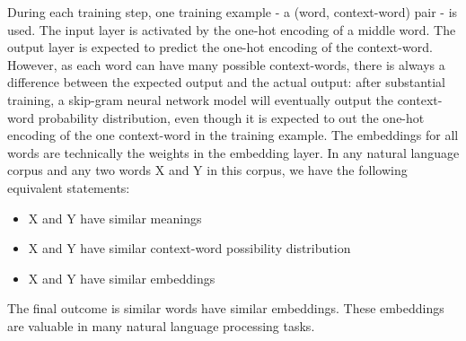 \documentclass[conference]{IEEEtran}
\begin{document}
During each training step, one training example - a (word, context-word) pair - is used.
The input layer is activated by the one-hot encoding of a middle word.
The output layer is expected to predict the one-hot encoding of the context-word.
However, as each word can have many possible context-words, there is always a difference between the expected output and the actual output:
after substantial training, a skip-gram neural network model will eventually output the context-word probability distribution,
even though it is expected to out the one-hot encoding of the one context-word in the training example.
The embeddings for all words are technically the weights in the embedding layer.
In any natural language corpus and any two words X and Y in this corpus, we have the following equivalent statements:
\begin{itemize}
	\item X and Y have similar meanings
	\item X and Y have similar context-word possibility distribution 
	\item X and Y have similar embeddings
\end{itemize}
The final outcome is similar words have similar embeddings.
These embeddings are valuable in many natural language processing tasks.
\end{document}
